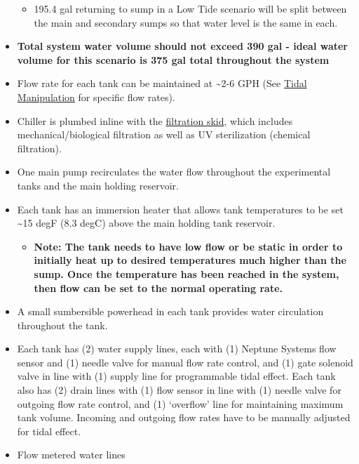 \documentclass[]{book}
\providecommand{\tightlist}{%
  \setlength{\itemsep}{0pt}\setlength{\parskip}{0pt}}
\begin{document}
\begin{itemize}
  \begin{itemize}
  \tightlist
  \item
    195.4 gal returning to sump in a Low Tide scenario will be split
    between the main and secondary sumps so that water level is the same
    in each.\\
  \end{itemize}
\item
  \textbf{Total system water volume should not exceed 390 gal - ideal
  water volume for this scenario is 375 gal total throughout the system}
\item
  Flow rate for each tank can be maintained at \textasciitilde{}2-6 GPH
  (See \href{chapters/07-tidal_manipulation.md}{Tidal Manipulation} for
  specific flow rates).\\
\item
  Chiller is plumbed inline with the
  \href{https://github.com/SilbigerLab/Mesocosm_User_Manual/blob/master/Manuals/Filtration_Skid_Build_Package.pdf}{filtration
  skid}, which includes mechanical/biological filtration as well as UV
  sterilization (chemical filtration).\\
\item
  One main pump recirculates the water flow throughout the experimental
  tanks and the main holding reservoir.\\
\item
  Each tank has an immersion heater that allows tank temperatures to be
  set \textasciitilde{}15 degF (8.3 degC) above the main holding tank
  reservoir.

  \begin{itemize}
  \tightlist
  \item
    \textbf{Note: The tank needs to have low flow or be static in order
    to initially heat up to desired temperatures much higher than the
    sump. Once the temperature has been reached in the system, then flow
    can be set to the normal operating rate.}\\
  \end{itemize}
\item
  A small sumbersible powerhead in each tank provides water circulation
  throughout the tank.\\
\item
  Each tank has (2) water supply lines, each with (1) Neptune Systems
  flow sensor and (1) needle valve for manual flow rate control, and (1)
  gate solenoid valve in line with (1) supply line for programmable
  tidal effect. Each tank also has (2) drain lines with (1) flow sensor
  in line with (1) needle valve for outgoing flow rate control, and (1)
  `overflow' line for maintaining maximum tank volume. Incoming and
  outgoing flow rates have to be manually adjusted for tidal effect.\\
\item
  Flow metered water lines


\end{itemize}
\end{document}
